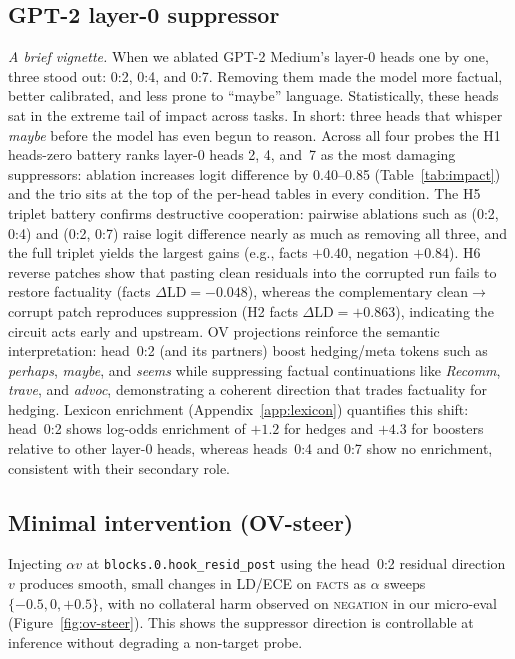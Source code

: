 \subsection{GPT-2 layer-0 suppressor}
\textit{A brief vignette.} When we ablated GPT-2 Medium’s layer-0 heads one by one, three stood out: 0:2, 0:4, and 0:7. Removing them made the model more factual, better calibrated, and less prone to “maybe” language. Statistically, these heads sat in the extreme tail of impact across tasks. In short: three heads that whisper \emph{maybe} before the model has even begun to reason.
Across all four probes the H1 heads-zero battery ranks layer-0 heads 2, 4, and~7 as the most damaging suppressors: ablation increases logit difference by 0.40--0.85 (Table~\ref{tab:impact}) and the trio sits at the top of the per-head tables in every condition.
The H5 triplet battery confirms destructive cooperation: pairwise ablations such as (0:2, 0:4) and (0:2, 0:7) raise logit difference nearly as much as removing all three, and the full triplet yields the largest gains (e.g., facts $+0.40$, negation $+0.84$).
H6 reverse patches show that pasting clean residuals into the corrupted run fails to restore factuality (facts $\Delta\mathrm{LD}=-0.048$), whereas the complementary clean$\rightarrow$corrupt patch reproduces suppression (H2 facts $\Delta\mathrm{LD}=+0.863$), indicating the circuit acts early and upstream.
OV projections reinforce the semantic interpretation: head~0:2 (and its partners) boost hedging/meta tokens such as \emph{perhaps}, \emph{maybe}, and \emph{seems} while suppressing factual continuations like \emph{Recomm}, \emph{trave}, and \emph{advoc}, demonstrating a coherent direction that trades factuality for hedging.
Lexicon enrichment (Appendix~\ref{app:lexicon}) quantifies this shift: head~0:2 shows log-odds enrichment of $+1.2$ for hedges and $+4.3$ for boosters relative to other layer-0 heads, whereas heads~0:4 and 0:7 show no enrichment, consistent with their secondary role.

\subsection*{Minimal intervention (OV-steer)}
Injecting $\alpha v$ at \verb|blocks.0.hook_resid_post| using the head~0:2 residual direction $v$ produces smooth, small changes in LD/ECE on \textsc{facts} as $\alpha$ sweeps $\{-0.5,0,+0.5\}$, with no collateral harm observed on \textsc{negation} in our micro-eval (Figure~\ref{fig:ov-steer}). This shows the suppressor direction is controllable at inference without degrading a non-target probe.

